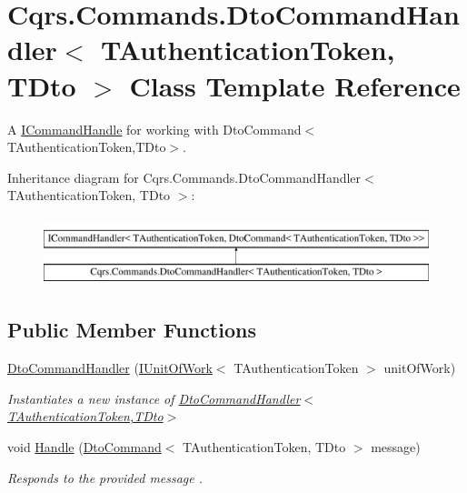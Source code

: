 \hypertarget{classCqrs_1_1Commands_1_1DtoCommandHandler}{}\section{Cqrs.\+Commands.\+Dto\+Command\+Handler$<$ T\+Authentication\+Token, T\+Dto $>$ Class Template Reference}
\label{classCqrs_1_1Commands_1_1DtoCommandHandler}


A \hyperlink{interfaceCqrs_1_1Commands_1_1ICommandHandle}{I\+Command\+Handle} for working with Dto\+Command$<$\+T\+Authentication\+Token,\+T\+Dto$>$.  


Inheritance diagram for Cqrs.\+Commands.\+Dto\+Command\+Handler$<$ T\+Authentication\+Token, T\+Dto $>$\+:\begin{figure}[H]
\begin{center}
\leavevmode
\includegraphics[height=2.000000cm]{classCqrs_1_1Commands_1_1DtoCommandHandler}
\end{center}
\end{figure}
\subsection*{Public Member Functions}
\begin{DoxyCompactItemize}
\item 
\hyperlink{classCqrs_1_1Commands_1_1DtoCommandHandler_aaff94627552cf26c503c628eb49adb60_aaff94627552cf26c503c628eb49adb60}{Dto\+Command\+Handler} (\hyperlink{interfaceCqrs_1_1Domain_1_1IUnitOfWork}{I\+Unit\+Of\+Work}$<$ T\+Authentication\+Token $>$ unit\+Of\+Work)
\begin{DoxyCompactList}\small\item\em Instantiates a new instance of \hyperlink{classCqrs_1_1Commands_1_1DtoCommandHandler_aaff94627552cf26c503c628eb49adb60_aaff94627552cf26c503c628eb49adb60}{Dto\+Command\+Handler$<$\+T\+Authentication\+Token,\+T\+Dto$>$} \end{DoxyCompactList}\item 
void \hyperlink{classCqrs_1_1Commands_1_1DtoCommandHandler_a344c5d909b31fe7ad6b81c69ab569fc8_a344c5d909b31fe7ad6b81c69ab569fc8}{Handle} (\hyperlink{classCqrs_1_1Commands_1_1DtoCommand}{Dto\+Command}$<$ T\+Authentication\+Token, T\+Dto $>$ message)
\begin{DoxyCompactList}\small\item\em Responds to the provided {\itshape message} . \end{DoxyCompactList}\end{DoxyCompactItemize}


